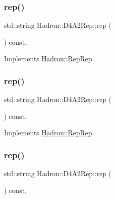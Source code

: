 \subsubsection{\texorpdfstring{rep()}{rep()}\hspace{0.1cm}{\footnotesize\ttfamily [3/5]}}
{\footnotesize\ttfamily std\+::string Hadron\+::\+D4\+A2\+Rep\+::rep (\begin{DoxyParamCaption}{ }\end{DoxyParamCaption}) const\hspace{0.3cm}{\ttfamily [inline]}, {\ttfamily [virtual]}}



Implements \mbox{\hyperlink{structHadron_1_1RepRep_ab3213025f6de249f7095892109575fde}{Hadron\+::\+Rep\+Rep}}.

\mbox{\label{structHadron_1_1D4A2Rep_aa51ab214e55a5545100ab53399ceb137}} 
\subsubsection{\texorpdfstring{rep()}{rep()}\hspace{0.1cm}{\footnotesize\ttfamily [4/5]}}
{\footnotesize\ttfamily std\+::string Hadron\+::\+D4\+A2\+Rep\+::rep (\begin{DoxyParamCaption}{ }\end{DoxyParamCaption}) const\hspace{0.3cm}{\ttfamily [inline]}, {\ttfamily [virtual]}}



Implements \mbox{\hyperlink{structHadron_1_1RepRep_ab3213025f6de249f7095892109575fde}{Hadron\+::\+Rep\+Rep}}.

\mbox{\label{structHadron_1_1D4A2Rep_aa51ab214e55a5545100ab53399ceb137}} 
\subsubsection{\texorpdfstring{rep()}{rep()}\hspace{0.1cm}{\footnotesize\ttfamily [5/5]}}
{\footnotesize\ttfamily std\+::string Hadron\+::\+D4\+A2\+Rep\+::rep (\begin{DoxyParamCaption}{ }\end{DoxyParamCaption}) const\hspace{0.3cm}{\ttfamily [inline]}, {\ttfamily [virtual]}}



